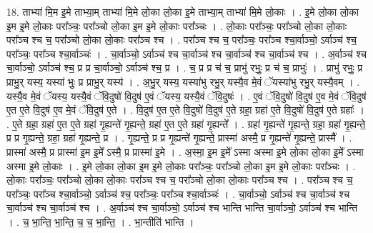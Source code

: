 \documentclass[17pt]{extarticle}
\begin{document}
18. ताभ्या॑ मि॒म इ॒मे ताभ्या॒म् ताभ्या॑ मि॒मे लो॒का लो॒का इ॒मे ताभ्या॒म् ताभ्या॑ मि॒मे लो॒काः । . इ॒मे लो॒का लो॒का इ॒म इ॒मे लो॒काः परा᳚ञ्चः॒ परा᳚ञ्चो लो॒का इ॒म इ॒मे लो॒काः परा᳚ञ्चः । . लो॒काः परा᳚ञ्चः॒ परा᳚ञ्चो लो॒का लो॒काः परा᳚ञ्च श्च च॒ परा᳚ञ्चो लो॒का लो॒काः परा᳚ञ्च श्च । . परा᳚ञ्च श्च च॒ परा᳚ञ्चः॒ परा᳚ञ्च श्चा॒र्वाञ्चो॒ ऽर्वाञ्च॑ श्च॒ परा᳚ञ्चः॒ परा᳚ञ्च श्चा॒र्वाञ्चः॑ । . चा॒र्वाञ्चो॒ ऽर्वाञ्च॑ श्च चा॒र्वाञ्च॑ श्च चा॒र्वाञ्च॑ श्च चा॒र्वाञ्च॑ श्च । . अ॒र्वाञ्च॑ श्च चा॒र्वाञ्चो॒ ऽर्वाञ्च॑ श्च॒ प्र प्र चा॒र्वाञ्चो॒ ऽर्वाञ्च॑ श्च॒ प्र । . च॒ प्र प्र च॑ च॒ प्राभु॑ रभुः॒ प्र च॑ च॒ प्राभुः॑ । . प्राभु॑ रभुः॒ प्र प्राभु॒र् यस्य॒ यस्या॑ भुः॒ प्र प्राभु॒र् यस्य॑ । . अ॒भु॒र् यस्य॒ यस्या॑भु रभु॒र् यस्यै॒व मे॒वं ॅयस्या॑भु रभु॒र् यस्यै॒वम् । . यस्यै॒व मे॒वं ॅयस्य॒ यस्यै॒वं ॅवि॒दुषो॑ वि॒दुष॑ ए॒वं ॅयस्य॒ यस्यै॒वं ॅवि॒दुषः॑ । . ए॒वं ॅवि॒दुषो॑ वि॒दुष॑ ए॒व मे॒वं ॅवि॒दुष॑ ए॒त ए॒ते वि॒दुष॑ ए॒व मे॒वं ॅवि॒दुष॑ ए॒ते । . वि॒दुष॑ ए॒त ए॒ते वि॒दुषो॑ वि॒दुष॑ ए॒ते ग्रहा॒ ग्रहा॑ ए॒ते वि॒दुषो॑ वि॒दुष॑ ए॒ते ग्रहाः᳚ । . ए॒ते ग्रहा॒ ग्रहा॑ ए॒त ए॒ते ग्रहा॑ गृ॒ह्यन्ते॑ गृ॒ह्यन्ते॒ ग्रहा॑ ए॒त ए॒ते ग्रहा॑ गृ॒ह्यन्ते᳚ । . ग्रहा॑ गृ॒ह्यन्ते॑ गृ॒ह्यन्ते॒ ग्रहा॒ ग्रहा॑ गृ॒ह्यन्ते॒ प्र प्र गृ॒ह्यन्ते॒ ग्रहा॒ ग्रहा॑ गृ॒ह्यन्ते॒ प्र । . गृ॒ह्यन्ते॒ प्र प्र गृ॒ह्यन्ते॑ गृ॒ह्यन्ते॒ प्रास्मा॑ अस्मै॒ प्र गृ॒ह्यन्ते॑ गृ॒ह्यन्ते॒ प्रास्मै᳚ । . प्रास्मा॑ अस्मै॒ प्र प्रास्मा॑ इ॒म इ॒मे᳚ ऽस्मै॒ प्र प्रास्मा॑ इ॒मे । . अ॒स्मा॒ इ॒म इ॒मे᳚ ऽस्मा अस्मा इ॒मे लो॒का लो॒का इ॒मे᳚ ऽस्मा अस्मा इ॒मे लो॒काः । . इ॒मे लो॒का लो॒का इ॒म इ॒मे लो॒काः परा᳚ञ्चः॒ परा᳚ञ्चो लो॒का इ॒म इ॒मे लो॒काः परा᳚ञ्चः । . लो॒काः परा᳚ञ्चः॒ परा᳚ञ्चो लो॒का लो॒काः परा᳚ञ्च श्च च॒ परा᳚ञ्चो लो॒का लो॒काः परा᳚ञ्च श्च । . परा᳚ञ्च श्च च॒ परा᳚ञ्चः॒ परा᳚ञ्च श्चा॒र्वाञ्चो॒ ऽर्वाञ्च॑ श्च॒ परा᳚ञ्चः॒ परा᳚ञ्च श्चा॒र्वाञ्चः॑ । . चा॒र्वाञ्चो॒ ऽर्वाञ्च॑ श्च चा॒र्वाञ्च॑ श्च चा॒र्वाञ्च॑ श्च चा॒र्वाञ्च॑ श्च । . अ॒र्वाञ्च॑ श्च चा॒र्वाञ्चो॒ ऽर्वाञ्च॑ श्च भान्ति भान्ति चा॒र्वाञ्चो॒ ऽर्वाञ्च॑ श्च भान्ति । . च॒ भा॒न्ति॒ भा॒न्ति॒ च॒ च॒ भा॒न्ति॒ । . भा॒न्तीति॑ भान्ति । \newline
\pagebreak
{}
\end{document}
